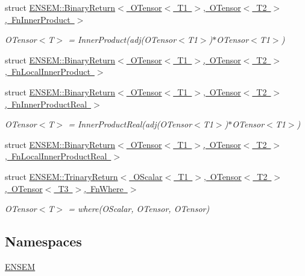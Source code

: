 \begin{DoxyCompactItemize}
\item 
struct \mbox{\hyperlink{structENSEM_1_1BinaryReturn_3_01OTensor_3_01T1_01_4_00_01OTensor_3_01T2_01_4_00_01FnInnerProduct_01_4}{E\+N\+S\+E\+M\+::\+Binary\+Return$<$ O\+Tensor$<$ T1 $>$, O\+Tensor$<$ T2 $>$, Fn\+Inner\+Product $>$}}
\begin{DoxyCompactList}\small\item\em O\+Tensor$<$\+T$>$ = Inner\+Product(adj(\+O\+Tensor$<$\+T1$>$)$\ast$\+O\+Tensor$<$\+T1$>$) \end{DoxyCompactList}\item 
struct \mbox{\hyperlink{structENSEM_1_1BinaryReturn_3_01OTensor_3_01T1_01_4_00_01OTensor_3_01T2_01_4_00_01FnLocalInnerProduct_01_4}{E\+N\+S\+E\+M\+::\+Binary\+Return$<$ O\+Tensor$<$ T1 $>$, O\+Tensor$<$ T2 $>$, Fn\+Local\+Inner\+Product $>$}}
\item 
struct \mbox{\hyperlink{structENSEM_1_1BinaryReturn_3_01OTensor_3_01T1_01_4_00_01OTensor_3_01T2_01_4_00_01FnInnerProductReal_01_4}{E\+N\+S\+E\+M\+::\+Binary\+Return$<$ O\+Tensor$<$ T1 $>$, O\+Tensor$<$ T2 $>$, Fn\+Inner\+Product\+Real $>$}}
\begin{DoxyCompactList}\small\item\em O\+Tensor$<$\+T$>$ = Inner\+Product\+Real(adj(\+O\+Tensor$<$\+T1$>$)$\ast$\+O\+Tensor$<$\+T1$>$) \end{DoxyCompactList}\item 
struct \mbox{\hyperlink{structENSEM_1_1BinaryReturn_3_01OTensor_3_01T1_01_4_00_01OTensor_3_01T2_01_4_00_01FnLocalInnerProductReal_01_4}{E\+N\+S\+E\+M\+::\+Binary\+Return$<$ O\+Tensor$<$ T1 $>$, O\+Tensor$<$ T2 $>$, Fn\+Local\+Inner\+Product\+Real $>$}}
\item 
struct \mbox{\hyperlink{structENSEM_1_1TrinaryReturn_3_01OScalar_3_01T1_01_4_00_01OTensor_3_01T2_01_4_00_01OTensor_3_01T3_01_4_00_01FnWhere_01_4}{E\+N\+S\+E\+M\+::\+Trinary\+Return$<$ O\+Scalar$<$ T1 $>$, O\+Tensor$<$ T2 $>$, O\+Tensor$<$ T3 $>$, Fn\+Where $>$}}
\begin{DoxyCompactList}\small\item\em O\+Tensor$<$\+T$>$ = where(\+O\+Scalar, O\+Tensor, O\+Tensor) \end{DoxyCompactList}\end{DoxyCompactItemize}
\subsection*{Namespaces}
\begin{DoxyCompactItemize}
\item 
 \mbox{\hyperlink{namespaceENSEM}{E\+N\+S\+EM}}
\end{DoxyCompactItemize}
